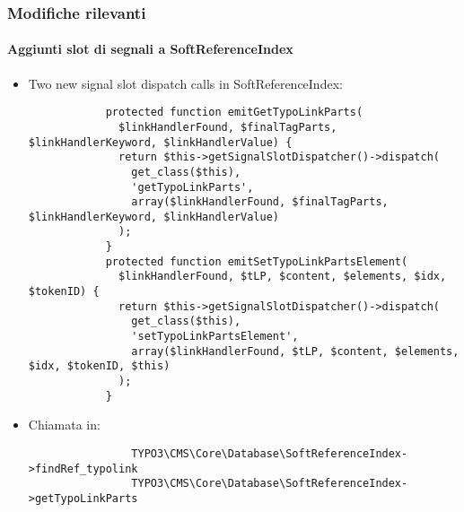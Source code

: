 \begin{frame}[fragile]
	\frametitle{Modifiche rilevanti}
	\framesubtitle{Aggiunti slot di segnali a SoftReferenceIndex}

	\lstset{
		basicstyle=\tiny\ttfamily
	}

	\begin{itemize}
		\item
			\smaller
				Two new signal slot dispatch calls in SoftReferenceIndex:
			\normalsize

		\begin{lstlisting}
			protected function emitGetTypoLinkParts(
			  $linkHandlerFound, $finalTagParts, $linkHandlerKeyword, $linkHandlerValue) {
			  return $this->getSignalSlotDispatcher()->dispatch(
			    get_class($this),
			    'getTypoLinkParts',
			    array($linkHandlerFound, $finalTagParts, $linkHandlerKeyword, $linkHandlerValue)
			  );
			}
			protected function emitSetTypoLinkPartsElement(
			  $linkHandlerFound, $tLP, $content, $elements, $idx, $tokenID) {
			  return $this->getSignalSlotDispatcher()->dispatch(
			    get_class($this),
			    'setTypoLinkPartsElement',
			    array($linkHandlerFound, $tLP, $content, $elements, $idx, $tokenID, $this)
			  );
			}
		\end{lstlisting}

		\item
			\smaller
				Chiamata in:
			\normalsize

			\begin{lstlisting}
				TYPO3\CMS\Core\Database\SoftReferenceIndex->findRef_typolink
				TYPO3\CMS\Core\Database\SoftReferenceIndex->getTypoLinkParts
			\end{lstlisting}

	\end{itemize}

\end{frame}


